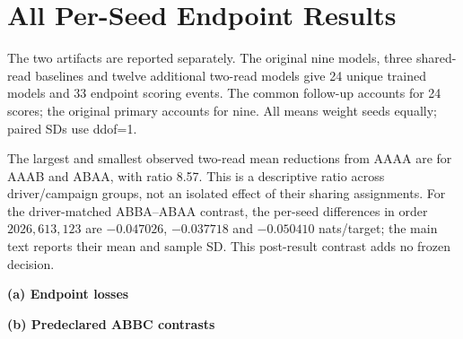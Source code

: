 \documentclass[11pt,letterpaper]{article}
\newcommand{\route}[1]{\textsf{#1}}
\newcommand{\TwoReadGainRatio}{8.57}
\newcommand{\WithinDriverSeedFirst}{-0.047026}
\newcommand{\WithinDriverSeedSecond}{-0.037718}
\newcommand{\WithinDriverSeedThird}{-0.050410}
\begin{document}
\section{All Per-Seed Endpoint Results}
\label{app:scores}
The two artifacts are reported separately. The original nine models,
three shared-read baselines and twelve additional two-read models give 24 unique trained
models and 33 endpoint scoring events. The common follow-up accounts for
24 scores; the original primary accounts for nine. All means weight seeds
equally; paired SDs use ddof=1.

The largest and smallest observed two-read mean reductions from \route{AAAA}
are for \route{AAAB} and \route{ABAA}, with ratio \TwoReadGainRatio{}.
This is a descriptive ratio across driver/campaign groups, not an isolated
effect of their sharing assignments. For the driver-matched \route{ABBA}--\route{ABAA}
contrast, the per-seed differences in order $2026,613,123$ are
$\WithinDriverSeedFirst$, $\WithinDriverSeedSecond$ and $\WithinDriverSeedThird$
nats/target; the main text reports their mean and sample SD.
This post-result contrast adds no frozen decision.

\begin{table}[!htbp]
\centering
{\small\textbf{(a) Endpoint losses}\par\smallskip
}
\par\medskip
{\small\setlength{\tabcolsep}{4pt}
\textbf{(b) Predeclared ABBC contrasts}\par\smallskip
}
\caption{Original-primary three-read replication at 2,000 updates.
(a) Loss in nats/target; bold marks the lowest observed loss in each seed
row and the equally weighted Mean row, not statistical superiority.
(b) Paired \route{ABBC} differences; SD uses three seed differences
(ddof=1). Both improvement criteria fail. This artifact tests
\route{AAAB}/\route{AABC}/\route{ABBC}; \route{AAAA} was not scored on it.
The common-follow-up baseline comparisons appear in
Table~\ref{tab:followup-per-seed}; absolute losses are not pooled across artifacts.}
\label{tab:fresh-nine}
\label{tab:fresh-decisions}
\end{table}
\end{document}
